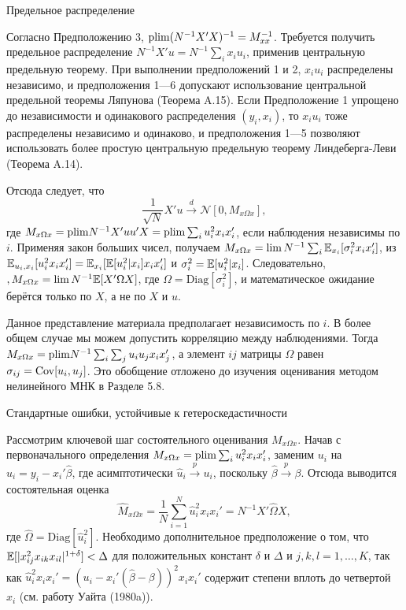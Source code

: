 \begin{center}
Предельное распределение
\end{center}

Согласно Предположению 3,  $\mathrm{plim } (N^{-1} X'X)^{-1}=M_{xx}^{-1}$. Требуется получить предельное распределение $N^{-1}X'u=N^{-1}\sum_i x_i u_i$, применив центральную предельную теорему. При выполнении предположений 1 и 2, $x_i u_i$ распределены независимо, и предположения 1---6 допускают использование центральной предельной теоремы Ляпунова (Теорема A.15). Если Предположение 1 упрощено до независимости и одинакового распределения $(y_i,x_i)$, то $x_i u_i$ тоже распределены независимо и одинаково, и предположения 1---5 позволяют использовать более простую центральную предельную теорему Линдеберга-Леви (Теорема A.14).

Отсюда следует, что 
\begin{equation}
\frac{1}{\sqrt{N}}X'u \xrightarrow{d} \mathcal{N} [0,M_{x \Omega x}],
\end{equation}
где $M_{x \Omega x} =\mathrm{plim } N^{-1} X'uu'X = \mathrm{plim } \sum_i u_i^2 x_i x_i'$, если наблюдения независимы по $i$. Применяя закон больших чисел, получаем $M_{x \Omega x} = \lim N^{-1} \sum_i \mathbb{E}_{x_i}[\sigma_i^2 x_i x_i']$, из $\mathbb{E}_{u_i,x_i}[u_i^2 x_i x_i'] = \mathbb{E}_{x_i}[\mathbb{E}[u_i^2|x_i]x_i x_i']$ и $\sigma_i^2 = \mathbb{E}[u_i^2|x_i]$. Следовательно, $,M_{x \Omega x} = \lim N^{-1} \mathbb{E}[X'\Omega X]$, где $\Omega = \mathrm{Diag}[\sigma_i^2]$, и математическое ожидание берётся только по $X$, а не по $X$ и $u$.

Данное представление материала предполагает независимость по $i$. В более общем случае мы можем допустить корреляцию между наблюдениями. Тогда $M_{x\Omega x} = \mathrm{plim } N^{-1} \sum_i \sum_j u_i u_j x_i x_j'$, а элемент $ij$ матрицы $\Omega$ равен $\sigma_{ij} = \mathrm{Cov}[u_i, u_j]$. Это обобщение отложено до изучения оценивания методом нелинейного МНК в Разделе 5.8.

\begin{center}
Стандартные ошибки, устойчивые к гетероскедастичности
\end{center}

Рассмотрим ключевой шаг состоятельного оценивания $M_{x \Omega x}$. Начав с первоначального определения $M_{x \Omega x} = \mathrm{plim } \sum_i u_i^2 x_i x_i'$, заменим $u_i$ на $\hat{u}_i = y_i-x_i'\hat{\beta}$, где асимптотически  $\hat{u}_i \xrightarrow{p} u_i$, поскольку $\hat{\beta} \xrightarrow{p} \beta$. Отсюда выводится состоятельная оценка
\begin{equation}
\hat{M}_{x \Omega x} = \frac{1}{N} \sum_{i=1}^{N}\hat{u}_i^2 x_i x_i' = N^{-1} X' \hat{\Omega} X,
\end{equation}
где $\hat{\Omega} = \mathrm{Diag}[\hat{u}_i^2]$. Необходимо дополнительное предположение о том, что $\mathbb{E} [|x_{ij}^2 x_{ik} x_{il}|^{1+\delta}]< \Delta$ для положительных констант $\delta$  и $\Delta$ и $j,k,l = 1, \ldots , K$, так как $\hat{u}_i^2 x_i x_i' = (u_i - x_i'(\hat{\beta} - \beta))^2 x_i x_i'$ содержит степени вплоть до четвертой $x_i$ (см. работу Уайта (1980a)).

